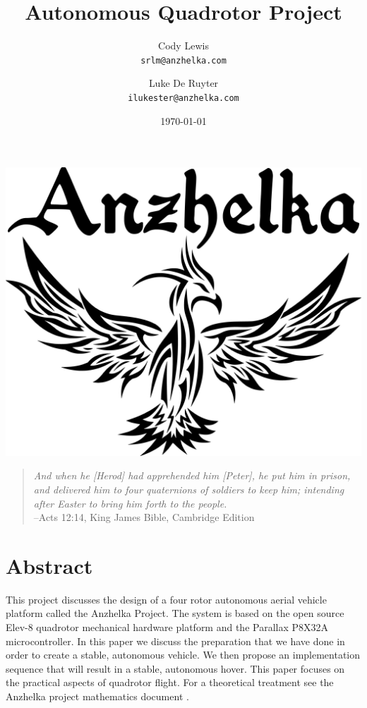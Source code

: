 \documentclass{article}
\numberwithin{equation}{section} %
\begin{document}
\title{\Huge Autonomous Quadrotor Project}
\author{Cody Lewis \\ \texttt{srlm@anzhelka.com} \and Luke De Ruyter \\ \texttt{ilukester@anzhelka.com} }
\date{\today}
\maketitle 
\begin{center}\includegraphics[scale=.24]{tribal_phoenix.jpg}\end{center}
\bigskip \bigskip \bigskip \bigskip \bigskip \bigskip \bigskip \bigskip \bigskip \bigskip
\begin{verse}\textit{
And when he [Herod] had apprehended him [Peter], he put him in prison, and delivered him to four quaternions of soldiers to keep him; intending after Easter to bring him forth to the people.} \\
\hfill --Acts 12:14, King James Bible, Cambridge Edition
\end{verse}



\newpage
{}
\section*{Abstract}
This project discusses the design of a four rotor autonomous aerial vehicle platform called the Anzhelka Project. The system is based on the open source Elev-8 quadrotor mechanical hardware platform and the Parallax P8X32A microcontroller. In this paper we discuss the preparation that we have done in order to create a stable, autonomous vehicle. We then propose an implementation sequence that will result in a stable, autonomous hover. This paper focuses on the practical aspects of quadrotor flight. For a theoretical treatment see the Anzhelka project mathematics document \cite{anzhelka_math}.
\end{document}
